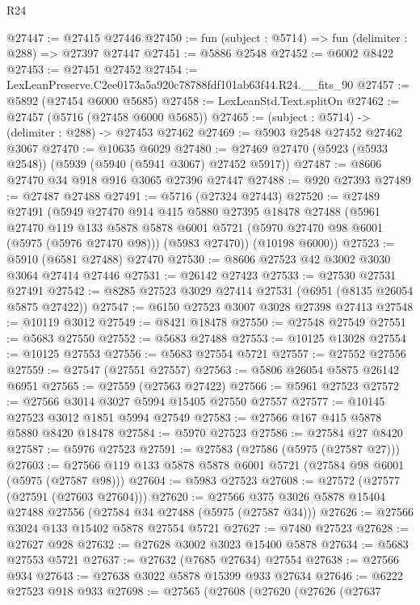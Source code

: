 \begin{lexlean}{R24}
\begin{coremodule}
@27447 := @27415 @27446
@27450 := fun (subject : @5714) => fun (delimiter : @288) => @27397 @27447
@27451 := @5886 @2548
@27452 := @6002 @8422
@27453 := @27451 @27452
@27454 := LexLeanPreserve.C2ee0173a5a920c78788fdf101ab63f44.R24.__fits_90
@27457 := @5892 (@27454 @6000 @5685)
@27458 := LexLeanStd.Text.splitOn
@27462 := @27457 (@5716 (@27458 @6000 @5685))
@27465 := (subject : @5714) -> (delimiter : @288) -> @27453 @27462
@27469 := @5903 @2548 @27452 @27462 @3067
@27470 := @10635 @6029
@27480 := @27469 @27470 (@5923 (@5933 @2548)) (@5939 (@5940 (@5941 @3067) @27452 @5917))
@27487 := @8606 @27470 @34 @918 @916 @3065 @27396 @27447
@27488 := @920 @27393
@27489 := @27487 @27488
@27491 := @5716 (@27324 @27443)
@27520 := @27489
    @27491
    (@5949
      @27470
      @914
      @415
      @5880
      @27395
      @18478
      @27488
      (@5961
        @27470
        @119
        @133
        @5878
        @5878
        @6001
        @5721
        (@5970 @27470 @98 @6001 (@5975 (@5976 @27470 @98)))
        (@5983 @27470))
      (@10198 @6000))
@27523 := @5910 (@6581 @27488) @27470
@27530 := @8606 @27523 @42 @3002 @3030 @3064 @27414 @27446
@27531 := @26142 @27423
@27533 := @27530 @27531 @27491
@27542 := @8285 @27523 @3029 @27414 @27531 (@6951 (@8135 @26054 @5875 @27422))
@27547 := @6150 @27523 @3007 @3028 @27398 @27413
@27548 := @10119 @3012
@27549 := @8421 @18478
@27550 := @27548 @27549
@27551 := @5683 @27550
@27552 := @5683 @27488
@27553 := @10125 @13028
@27554 := @10125 @27553
@27556 := @5683 @27554 @5721
@27557 := @27552 @27556
@27559 := @27547 (@27551 @27557)
@27563 := @5806 @26054 @5875 @26142 @6951
@27565 := @27559 (@27563 @27422)
@27566 := @5961 @27523
@27572 := @27566 @3014 @3027 @5994 @15405 @27550 @27557
@27577 := @10145 @27523 @3012 @1851 @5994 @27549
@27583 := @27566 @167 @415 @5878 @5880 @8420 @18478
@27584 := @5970 @27523
@27586 := @27584 @27 @8420
@27587 := @5976 @27523
@27591 := @27583 (@27586 (@5975 (@27587 @27)))
@27603 := @27566 @119 @133 @5878 @5878 @6001 @5721 (@27584 @98 @6001 (@5975 (@27587 @98)))
@27604 := @5983 @27523
@27608 := @27572 (@27577 (@27591 (@27603 @27604)))
@27620 := @27566 @375 @3026 @5878 @15404 @27488 @27556 (@27584 @34 @27488 (@5975 (@27587 @34)))
@27626 := @27566 @3024 @133 @15402 @5878 @27554 @5721
@27627 := @7480 @27523
@27628 := @27627 @928
@27632 := @27628 @3002 @3023 @15400 @5878
@27634 := @5683 @27553 @5721
@27637 := @27632 (@7685 @27634) @27554
@27638 := @27566 @934
@27643 := @27638 @3022 @5878 @15399 @933 @27634
@27646 := @6222 @27523 @918 @933
@27698 := @27565
    (@27608
      (@27620
        (@27626
          (@27637

\end{coremodule}
\end{lexlean}
